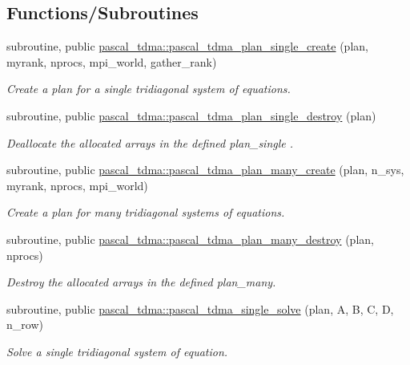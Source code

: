 \subsection*{Functions/\+Subroutines}
\begin{DoxyCompactItemize}
\item 
subroutine, public \hyperlink{namespacepascal__tdma_a5dfc2d7c919b47ad364a74d141532a9f}{pascal\+\_\+tdma\+::pascal\+\_\+tdma\+\_\+plan\+\_\+single\+\_\+create} (plan, myrank, nprocs, mpi\+\_\+world, gather\+\_\+rank)
\begin{DoxyCompactList}\small\item\em Create a plan for a single tridiagonal system of equations. \end{DoxyCompactList}\item 
subroutine, public \hyperlink{namespacepascal__tdma_adb04e59c740ce6c4b9518dd86eaeb594}{pascal\+\_\+tdma\+::pascal\+\_\+tdma\+\_\+plan\+\_\+single\+\_\+destroy} (plan)
\begin{DoxyCompactList}\small\item\em Deallocate the allocated arrays in the defined plan\+\_\+single . \end{DoxyCompactList}\item 
subroutine, public \hyperlink{namespacepascal__tdma_a7e9c24b343ae949044eccc8692dcc6e9}{pascal\+\_\+tdma\+::pascal\+\_\+tdma\+\_\+plan\+\_\+many\+\_\+create} (plan, n\+\_\+sys, myrank, nprocs, mpi\+\_\+world)
\begin{DoxyCompactList}\small\item\em Create a plan for many tridiagonal systems of equations. \end{DoxyCompactList}\item 
subroutine, public \hyperlink{namespacepascal__tdma_aceec478e18d25d413a5bd8a174c3fcb8}{pascal\+\_\+tdma\+::pascal\+\_\+tdma\+\_\+plan\+\_\+many\+\_\+destroy} (plan, nprocs)
\begin{DoxyCompactList}\small\item\em Destroy the allocated arrays in the defined plan\+\_\+many. \end{DoxyCompactList}\item 
subroutine, public \hyperlink{namespacepascal__tdma_ab14e132231d4b53fd65dd333ccc85a50}{pascal\+\_\+tdma\+::pascal\+\_\+tdma\+\_\+single\+\_\+solve} (plan, A, B, C, D, n\+\_\+row)
\begin{DoxyCompactList}\small\item\em Solve a single tridiagonal system of equation. \end{DoxyCompactList}\item 

\end{DoxyCompactItemize}
